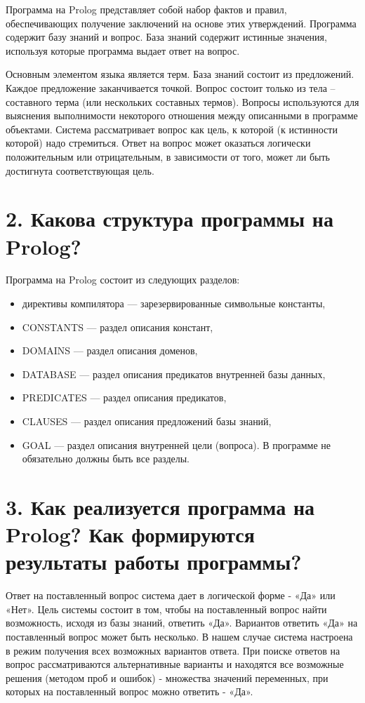 \documentclass[12pt]{report}
\begin{document}
Программа на Prolog представляет собой набор фактов и правил, обеспечивающих получение заключений на основе этих утверждений. Программа содержит базу знаний и вопрос. База знаний содержит истинные значения, используя которые программа выдает ответ на вопрос. 

Основным элементом языка является терм. База знаний состоит из предложений. Каждое предложение заканчивается точкой. Вопрос состоит только из тела – составного терма (или нескольких составных термов). Вопросы используются для выяснения выполнимости некоторого отношения между описанными в программе объектами. Система рассматривает вопрос как цель, к которой (к истинности которой) надо стремиться. Ответ на вопрос может оказаться логически положительным или отрицательным, в зависимости от того, может ли быть достигнута соответствующая цель.

\section*{2. Какова структура программы на Prolog?}

Программа на Prolog состоит из следующих разделов:

\begin{itemize}
	\item директивы компилятора — зарезервированные символьные константы,
	\item CONSTANTS — раздел описания констант,
	\item DOMAINS — раздел описания доменов,
	\item DATABASE — раздел описания предикатов внутренней базы данных,
	\item PREDICATES — раздел описания предикатов,
	\item CLAUSES — раздел описания предложений базы знаний,
	\item GOAL — раздел описания внутренней цели (вопроса).
	В программе не обязательно должны быть все разделы.
\end{itemize}

\section*{3. Как реализуется программа на Prolog? Как формируются результаты работы программы?}

Ответ на поставленный вопрос система дает в логической форме - «Да» или «Нет». Цель системы состоит в том, чтобы на поставленный вопрос найти возможность, исходя из базы знаний, ответить «Да». Вариантов ответить «Да» на поставленный вопрос может быть несколько. В нашем случае система настроена в режим получения всех возможных вариантов ответа. При поиске ответов на вопрос рассматриваются альтернативные варианты и находятся все возможные решения (методом проб и ошибок) - множества значений переменных, при которых на поставленный вопрос можно ответить - «Да».
\end{document}
